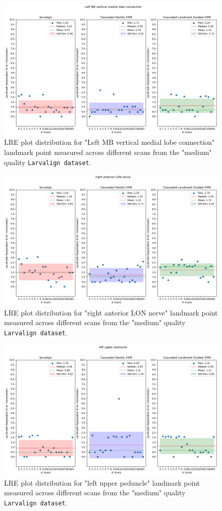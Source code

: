 \documentclass{book}
\begin{document}
	\begin{figure}[h!]
		\centering
		\includegraphics[width=0.75\columnwidth]{resources/chapter5_fresh/output/Left MB vertical medial lobe connection.png}
		\caption{LRE plot distribution for "Left MB vertical medial lobe connection" landmark point measured across different scans from the "medium" quality \texttt{Larvalign dataset}.}
		\label{fig:landmark12}
	\end{figure}
	
	\begin{figure}[h!]
		\centering
		\includegraphics[width=0.75\columnwidth]{resources/chapter5_fresh/output/right anterior LON nerve.png}
		\caption{LRE plot distribution for "right anterior LON nerve" landmark point measured across different scans from the "medium" quality \texttt{Larvalign dataset}.}
		\label{fig:landmark13}
	\end{figure}
	
	\begin{figure}[h!]
		\centering
		\includegraphics[width=0.75\columnwidth]{resources/chapter5_fresh/output/left upper peduncle.png}
		\caption{LRE plot distribution for "left upper peduncle" landmark point measured across different scans from the "medium" quality \texttt{Larvalign dataset}.}
		\label{fig:landmark14}
	\end{figure}
	
\end{document}
